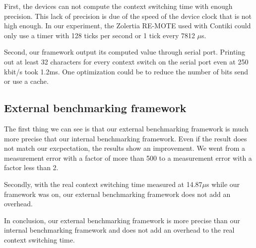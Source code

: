 First, the devices can not compute the context switching time with enough precision.
This lack of precision is due of the speed of the device clock that is not high enough.
In our experiment, the Zolertia RE-MOTE used with Contiki could only use a timer with 128 ticks per second or 1 tick every 7812 $\mu$s.

Second, our framework output its computed value through serial port.
Printing out at least 32 characters for every context switch on the serial port even at 250 kbit/s took 1.2ms.
One optimization could be to reduce the number of bits send or use a cache.

\subsection{External benchmarking framework}

The first thing we can see is that our external benchmarking framework is much more precise that our internal benchmarking framework.
Even if the result does not match our excpectation, the results show an improvement.
We went from a measurement error with a factor of more than 500 to a measurement error with a factor less than 2.

Secondly, with the real context switching time measured at 14.87$\mu$s while our framework was on, our external benchmarking framework does not add an overhead.

In conclusion, our external benchmarking framework is more precise than our internal benchmarking framework and does not add an overhead to the real context switching time.